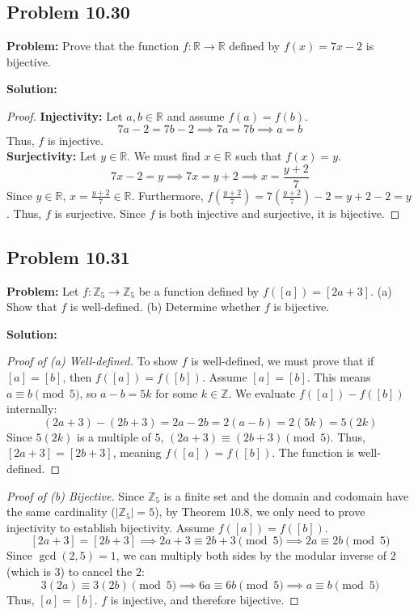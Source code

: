 \documentclass[11pt, a4paper]{article}
\theoremstyle{definition}
\theoremstyle{remark}
\newcommand{\R}{\mathbb{R}}
\newcommand{\Z}{\mathbb{Z}}
\begin{document}
\subsection{Problem 10.30}
\textbf{Problem:} Prove that the function $f: \R \to \R$ defined by $f(x) = 7x - 2$ is bijective.

\textbf{Solution:}
\begin{proof}
\textbf{Injectivity:} Let $a, b \in \R$ and assume $f(a) = f(b)$. 
\[ 7a - 2 = 7b - 2 \implies 7a = 7b \implies a = b \]
Thus, $f$ is injective. \\
\textbf{Surjectivity:} Let $y \in \R$. We must find $x \in \R$ such that $f(x) = y$. 
\[ 7x - 2 = y \implies 7x = y + 2 \implies x = \frac{y + 2}{7} \]
Since $y \in \R$, $x = \frac{y+2}{7} \in \R$. Furthermore, $f\left(\frac{y+2}{7}\right) = 7\left(\frac{y+2}{7}\right) - 2 = y + 2 - 2 = y$. 
Thus, $f$ is surjective. Since $f$ is both injective and surjective, it is bijective.
\end{proof}

\subsection{Problem 10.31}
\textbf{Problem:} Let $f: \Z_5 \to \Z_5$ be a function defined by $f([a]) = [2a + 3]$. (a) Show that $f$ is well-defined. (b) Determine whether $f$ is bijective.

\textbf{Solution:}
\begin{proof}[Proof of (a) Well-defined]
To show $f$ is well-defined, we must prove that if $[a] = [b]$, then $f([a]) = f([b])$. 
Assume $[a] = [b]$. This means $a \equiv b \pmod 5$, so $a - b = 5k$ for some $k \in \Z$. 
We evaluate $f([a]) - f([b])$ internally:
\[ (2a + 3) - (2b + 3) = 2a - 2b = 2(a - b) = 2(5k) = 5(2k) \]
Since $5(2k)$ is a multiple of $5$, $(2a+3) \equiv (2b+3) \pmod 5$. Thus, $[2a+3] = [2b+3]$, meaning $f([a]) = f([b])$. The function is well-defined.
\end{proof}

\begin{proof}[Proof of (b) Bijective]
Since $\Z_5$ is a finite set and the domain and codomain have the same cardinality ($|\Z_5| = 5$), by Theorem 10.8, we only need to prove injectivity to establish bijectivity.
Assume $f([a]) = f([b])$. 
\[ [2a + 3] = [2b + 3] \implies 2a + 3 \equiv 2b + 3 \pmod 5 \implies 2a \equiv 2b \pmod 5 \]
Since $\gcd(2, 5) = 1$, we can multiply both sides by the modular inverse of $2$ (which is $3$) to cancel the $2$:
\[ 3(2a) \equiv 3(2b) \pmod 5 \implies 6a \equiv 6b \pmod 5 \implies a \equiv b \pmod 5 \]
Thus, $[a] = [b]$. $f$ is injective, and therefore bijective.
\end{proof}
\end{document}

